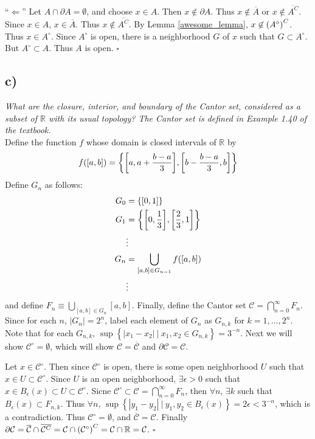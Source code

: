 \documentclass[12pt]{article}
\theoremstyle{plain}
\begin{document}
\noindent``$\Longleftarrow$''  Let $A \cap \partial A = \emptyset$, and choose $x \in A$.  Then $x \not\in \partial A$.  Thus $x \not\in \overline{A}$ or $x \not\in \overline{A^C}$.  Since $x \in A$, $x \in \overline{A}$.  Thus $x \not\in \overline{A^C}$.  By Lemma \ref{awesome_lemma}, $x \not\in \qty(A^\circ)^C$.  Thus $x \in A^\circ$.  Since $A^\circ$ is open, there is a neighborhood $G$ of $x$ such that $G \subset A^\circ$.  But $A^\circ \subset A$.  Thus $A$ is open. \hfill $\square$

\subsection*{ c)}
\emph{What are the closure, interior, and boundary of the Cantor set, considered as a subset of $\mathbb{R}$ with its usual topology?  The Cantor set is defined in Example 1.40 of the textbook.}\\

Define the function $f$ whose domain is closed intervals of $\mathbb{R}$ by 
\begin{align*}
    f([a,b]) = \left\{\qty[a, a + \frac{b-a}{3}], \qty[b - \frac{b-a}{3}, b]\right\}
\end{align*}
Define $G_n$ as follows:
\begin{align*}
    G_0 &= \left\{\qty[0,1]\right\} \\
    G_1 &= \left\{\qty[0, \frac{1}{3}], \qty[\frac{2}{3}, 1]\right\} \\
    &\vdots \\
    G_n &= \bigcup\limits_{[a,b] \in G_{n-1}} f([a,b])\\
    &\vdots
\end{align*}
and define $F_n \equiv \bigcup\limits_{[a,b] \in G_n} [a,b]$.  Finally, define the Cantor set $\mathcal{C} = \bigcap\limits_{n=0}^\infty F_n$.  Since for each $n$, $\left|G_n\right| = 2^n$, label each element of $G_n$ as $G_{n,k}$ for $k = 1, \dots, 2^n$.  Note that for each $G_{n,k}$, $\sup\left\{|x_1 - x_2|\ |\ x_1,x_2 \in G_{n,k}\right\} = 3^{-n}$. Next we will show $\mathcal{C}^\circ = \emptyset$, which will show $\mathcal{C} = \overline{\mathcal{C}}$ and $\partial\mathcal{C} = \mathcal{C}$.

Let $x \in \mathcal{C}^\circ$.  Then since $\mathcal{C}^\circ$ is open, there is some open neighborhood $U$ such that $x \in U \subset \mathcal{C}^\circ$.  Since $U$ is an open neighborhood, $\exists \epsilon > 0$ such that $x \in B_\epsilon(x) \subset U \subset \mathcal{C}^\circ$.  Sicne $\mathcal{C}^\circ \subset \mathcal{C} = \bigcap\limits_{n=0}^\infty F_n$, then $\forall n$, $\exists k$ such that $B_\epsilon(x) \subset F_{n,k}$.  Thus $\forall n$, $\sup\left\{|y_1 - y_2|\ |\ y_1,y_2 \in B_\epsilon(x)\right\} = 2\epsilon < 3^{-n}$, which is a contradiction.  Thus $\mathcal{C}^\circ = \emptyset$, and $\overline{\mathcal{C}} = \mathcal{C}$.  Finally $\partial\mathcal{C} = \overline{\mathcal{C}} \cap \overline{\mathcal{C}^C} = \mathcal{C} \cap \qty(\mathcal{C}^\circ)^C = \mathcal{C} \cap \mathbb{R} = \mathcal{C}$. \hfill $\square$
\end{document}
